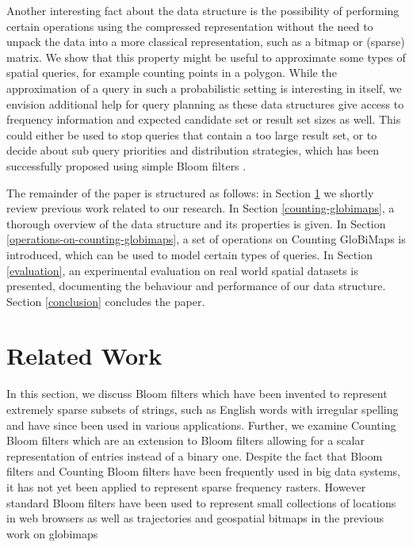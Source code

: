 \documentclass[sigconf, nonacm]{acmart}
\begin{document}

Another interesting fact about the data structure is the possibility of performing certain operations using the compressed representation without the need to unpack the data into a more classical representation, such as a bitmap or (sparse) matrix. We show that this property might be useful to approximate some types of spatial queries, for example counting points in a polygon. While the approximation of a query in such a probabilistic setting is interesting in itself, we envision additional help for query planning as these data structures give access to frequency information and expected candidate set or result set sizes as well. This could either be used to stop queries that contain a too large result set, or to decide about sub query priorities and distribution strategies, which has been successfully proposed using simple Bloom filters \cite{michael2007improving, lee2012join, papapetrou2010cardinality}.

The remainder of the paper is structured as follows: in Section \ref{related-work} we shortly review previous work related to our research. In Section \ref{counting-globimaps}, a thorough overview of the data structure and its properties is given. In Section \ref{operations-on-counting-globimaps}, a set of operations on Counting GloBiMaps is introduced, which can be used to model certain types of queries. In Section \ref{evaluation}, an experimental evaluation on real world spatial datasets is presented, documenting the behaviour and performance of our data structure. Section \ref{conclusion} concludes the paper.

%


\section{Related Work}\label{related-work}

In this section, we discuss Bloom filters  which have been invented to represent extremely sparse subsets of strings, such as English words with irregular spelling and have since been used in various applications. Further, we examine Counting Bloom filters which are an extension to Bloom filters allowing for a scalar representation of entries instead of a binary one.
Despite the fact that Bloom filters and Counting  Bloom filters have been frequently used in big data systems, it has not yet been applied to represent sparse frequency rasters. However standard Bloom filters have been used to represent small collections of locations in web browsers \cite{ruppel2014geocookie} as well as trajectories \cite{werner2015bacr} and geospatial bitmaps in the previous work on globimaps \cite{werner2019globimaps}
\end{document}

